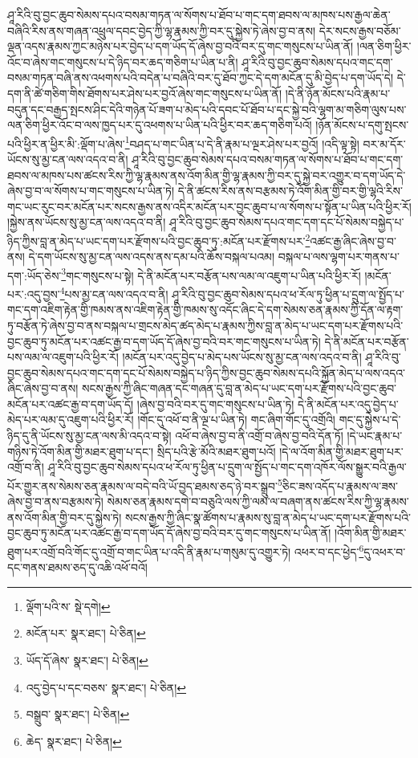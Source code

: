 ཤཱ་རིའི་བུ་བྱང་ཆུབ་སེམས་དཔའ་བསམ་གཏན་ལ་སོགས་པ་ཐོབ་པ་གང་དག་ཐབས་ལ་མཁས་པས་རྒྱལ་ཆེན་བཞིའི་རིས་ནས་གཞན་འཕྲུལ་དབང་བྱེད་ཀྱི་ལྷ་རྣམས་ཀྱི་བར་དུ་སྐྱེས་ཏེ་ཞེས་བྱ་བ་ནས། དེར་སངས་རྒྱས་བཅོམ་ལྡན་འདས་རྣམས་ཀྱང་མཉེས་པར་བྱེད་པ་དག་ཡོད་དོ་ཞེས་བྱ་བའི་བར་དུ་གང་གསུངས་པ་ཡིན་ནོ། །ལན་ཅིག་ཕྱིར་འོང་བ་ཞེས་གང་གསུངས་པ་དེ་ཉིད་བར་ཆད་གཅིག་པ་ཡིན་པ་ནི། ཤཱ་རིའི་བུ་བྱང་ཆུབ་སེམས་དཔའ་གང་དག་བསམ་གཏན་བཞི་ནས་འཕགས་པའི་བདེན་པ་བཞིའི་བར་དུ་ཐོབ་ཀྱང་དེ་དག་མངོན་དུ་མི་བྱེད་པ་དག་ཡོད་དེ། དེ་དག་ནི་ཚེ་གཅིག་གིས་ཐོགས་པར་ཤེས་པར་བྱའོ་ཞེས་གང་གསུངས་པ་ཡིན་ནོ། །དེ་ནི་ཉོན་མོངས་པའི་རྣམ་པ་བདུན་དང་བརྒྱད་སྤངས་ཤིང་དེའི་གཉེན་པོ་ཟག་པ་མེད་པའི་དབང་པོ་ཐོབ་པ་དང་སྐྱེ་བའི་ལྷག་མ་གཅིག་ལུས་པས་ལན་ཅིག་ཕྱིར་འོང་བ་ལས་ཁྱད་པར་དུ་འཕགས་པ་ཡིན་པའི་ཕྱིར་བར་ཆད་གཅིག་པའོ། །ཉོན་མོངས་པ་དགུ་སྤངས་པའི་ཕྱིར་ན་ཕྱིར་མི་:ལྡོག་པ་ཞེས་\footnote{ལྡོག་པའི་ས་  སྡེ་དགེ། }བཤད་པ་གང་ཡིན་པ་དེ་ནི་རྣམ་པ་ལྔར་ཤེས་པར་བྱའོ། །འདི་ལྟ་སྟེ། བར་མ་དོར་ཡོངས་སུ་མྱ་ངན་ལས་འདའ་བ་ནི། ཤཱ་རིའི་བུ་བྱང་ཆུབ་སེམས་དཔའ་བསམ་གཏན་ལ་སོགས་པ་ཐོབ་པ་གང་དག་ཐབས་ལ་མཁས་པས་ཚངས་རིས་ཀྱི་ལྷ་རྣམས་ནས་འོག་མིན་གྱི་ལྷ་རྣམས་ཀྱི་བར་དུ་སྐྱེ་བར་འགྱུར་བ་དག་ཡོད་དེ་ཞེས་བྱ་བ་ལ་སོགས་པ་གང་གསུངས་པ་ཡིན་ཏེ། དེ་ནི་ཚངས་རིས་ནས་བརྩམས་ཏེ་འོག་མིན་གྱི་བར་གྱི་ལྷའི་རིས་གང་ཡང་རུང་བར་མངོན་པར་སངས་རྒྱས་ནས་འདིར་མངོན་པར་བྱང་ཆུབ་པ་ལ་སོགས་པ་སྟོན་པ་ཡིན་པའི་ཕྱིར་རོ། །སྐྱེས་ནས་ཡོངས་སུ་མྱ་ངན་ལས་འདའ་བ་ནི། ཤཱ་རིའི་བུ་བྱང་ཆུབ་སེམས་དཔའ་གང་དག་དང་པོ་སེམས་བསྐྱེད་པ་ཉིད་ཀྱིས་བླ་ན་མེད་པ་ཡང་དག་པར་རྫོགས་པའི་བྱང་ཆུབ་ཏུ་:མངོན་པར་རྫོགས་པར་\footnote{མངོན་པར་  སྣར་ཐང་།  པེ་ཅིན། }འཚང་རྒྱ་ཞིང་ཞེས་བྱ་བ་ནས། དེ་དག་ཡོངས་སུ་མྱ་ངན་ལས་འདས་ནས་དམ་པའི་ཆོས་བསྐལ་པའམ། བསྐལ་པ་ལས་ལྷག་པར་གནས་པ་དག་:ཡོད་ཅེས་\footnote{ཡོད་དོ་ཞེས་  སྣར་ཐང་།  པེ་ཅིན། }གང་གསུངས་པ་སྟེ། དེ་ནི་མངོན་པར་བརྩོན་པས་ལམ་ལ་འཇུག་པ་ཡིན་པའི་ཕྱིར་རོ། །མངོན་པར་:འདུ་བྱས་\footnote{འདུ་བྱེད་པ་དང་བཅས་  སྣར་ཐང་།  པེ་ཅིན། }པས་མྱ་ངན་ལས་འདའ་བ་ནི། ཤཱ་རིའི་བུ་བྱང་ཆུབ་སེམས་དཔའ་ཕ་རོལ་ཏུ་ཕྱིན་པ་དྲུག་ལ་སྤྱོད་པ་གང་དག་འཇིག་རྟེན་གྱི་ཁམས་ནས་འཇིག་རྟེན་གྱི་ཁམས་སུ་འདོང་ཞིང་དེ་དག་སེམས་ཅན་རྣམས་ཀྱི་དོན་ལ་རྟག་ཏུ་བརྩོན་ཏེ་ཞེས་བྱ་བ་ནས་བསྐལ་པ་གྲངས་མེད་ཚད་མེད་པ་རྣམས་ཀྱིས་བླ་ན་མེད་པ་ཡང་དག་པར་རྫོགས་པའི་བྱང་ཆུབ་ཏུ་མངོན་པར་འཚང་རྒྱ་བ་དག་ཡོད་དོ་ཞེས་བྱ་བའི་བར་གང་གསུངས་པ་ཡིན་ཏེ། དེ་ནི་མངོན་པར་བརྩོན་པས་ལམ་ལ་འཇུག་པའི་ཕྱིར་རོ། །མངོན་པར་འདུ་བྱེད་པ་མེད་པས་ཡོངས་སུ་མྱ་ངན་ལས་འདའ་བ་ནི། ཤཱ་རིའི་བུ་བྱང་ཆུབ་སེམས་དཔའ་གང་དག་དང་པོ་སེམས་བསྐྱེད་པ་ཉིད་ཀྱིས་བྱང་ཆུབ་སེམས་དཔའི་སྐྱོན་མེད་པ་ལས་འདའ་ཞིང་ཞེས་བྱ་བ་ནས། སངས་རྒྱས་ཀྱི་ཞིང་གཞན་དང་གཞན་དུ་བླ་ན་མེད་པ་ཡང་དག་པར་རྫོགས་པའི་བྱང་ཆུབ་མངོན་པར་འཚང་རྒྱ་བ་དག་ཡོད་དོ། །ཞེས་བྱ་བའི་བར་དུ་གང་གསུངས་པ་ཡིན་ཏེ། དེ་ནི་མངོན་པར་འདུ་བྱེད་པ་མེད་པར་ལམ་དུ་འཇུག་པའི་ཕྱིར་རོ། །གོང་དུ་འཕོ་བ་ནི་ལྔ་པ་ཡིན་ཏེ། གང་ཞིག་གོང་དུ་འགྲོའི། གང་དུ་སྐྱེས་པ་དེ་ཉིད་དུ་ནི་ཡོངས་སུ་མྱ་ངན་ལས་མི་འདའ་བ་སྟེ། འཕོ་བ་ཞེས་བྱ་བ་ནི་འགྲོ་བ་ཞེས་བྱ་བའི་དོན་ཏོ། །དེ་ཡང་རྣམ་པ་གཉིས་ཏེ་འོག་མིན་གྱི་མཐར་ཐུག་པ་དང་། སྲིད་པའི་རྩེ་མོའི་མཐར་ཐུག་པའོ། །དེ་ལ་འོག་མིན་གྱི་མཐར་ཐུག་པར་འགྲོ་བ་ནི། ཤཱ་རིའི་བུ་བྱང་ཆུབ་སེམས་དཔའ་ཕ་རོལ་ཏུ་ཕྱིན་པ་དྲུག་ལ་སྤྱོད་པ་གང་དག་འཁོར་ལོས་སྒྱུར་བའི་རྒྱལ་པོར་གྱུར་ནས་སེམས་ཅན་རྣམས་ལ་བདེ་བའི་ཡོ་བྱད་ཐམས་ཅད་ཉེ་བར་སྒྲུབ་\footnote{བསྒྲུབ་  སྣར་ཐང་།  པེ་ཅིན། }ཅིང་ཟས་འདོད་པ་རྣམས་ལ་ཟས་ཞེས་བྱ་བ་ནས་བརྩམས་ཏེ། སེམས་ཅན་རྣམས་དགེ་བ་བཅུའི་ལས་ཀྱི་ལམ་ལ་བཞག་ནས་ཚངས་རིས་ཀྱི་ལྷ་རྣམས་ནས་འོག་མིན་གྱི་བར་དུ་སྐྱེས་ཏེ། སངས་རྒྱས་ཀྱི་ཞིང་སྣ་ཚོགས་པ་རྣམས་སུ་བླ་ན་མེད་པ་ཡང་དག་པར་རྫོགས་པའི་བྱང་ཆུབ་ཏུ་མངོན་པར་འཚང་རྒྱ་བ་དག་ཡོད་དོ་ཞེས་བྱ་བའི་བར་དུ་གང་གསུངས་པ་ཡིན་ནོ། །འོག་མིན་གྱི་མཐར་ཐུག་པར་འགྲོ་བའི་གོང་དུ་འགྲོ་བ་གང་ཡིན་པ་འདི་ནི་རྣམ་པ་གསུམ་དུ་འགྱུར་ཏེ། འཕར་བ་དང་ཕྱེད་\footnote{ཆེད་  སྣར་ཐང་།  པེ་ཅིན། }དུ་འཕར་བ་དང་གནས་ཐམས་ཅད་དུ་འཆི་འཕོ་བའོ། 